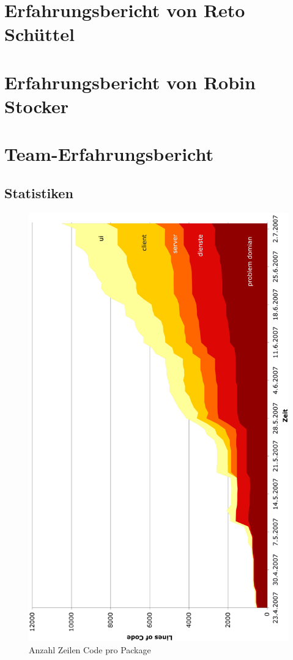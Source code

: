 \documentclass[12pt,halfparskip]{scrartcl}
\begin{document}
\section{Erfahrungsbericht von Reto Schüttel}

\section{Erfahrungsbericht von Robin Stocker}

\section{Team-Erfahrungsbericht}

\subsection{Statistiken}
\begin{figure}[h]
	\centering
	\includegraphics[width=0.8 \textwidth]{anzahl_zeilen_pro_package}
	\caption{Anzahl Zeilen Code pro Package}
	\label{fig:anzahl_zeilen_pro_package}
\end{figure}
\end{document}
